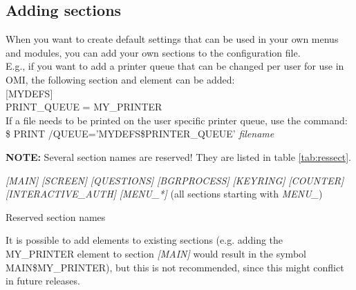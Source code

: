 \documentclass[a4paper]{book}
\newcommand{\vs}{\vspace{3mm}}
\renewcommand{\indent}{\hspace*{5mm}}
\begin{document}
\subsection{Adding sections}
\label{subsubsec:adding}

When you want to create default settings that can be used in your own menus 
and modules, you can add your own sections to the configuration file. \\
E.g., if you want to add a printer queue that can be changed per user for 
use in OMI, the following section and element can be added: \\
\indent\textsf{[MYDEFS]} \\
\indent\indent\textsf{PRINT{\_}QUEUE = MY{\_}PRINTER} \\
If a file needs to be printed on the user specific printer queue, use the command: \\
\indent\textsf{{\$} PRINT /QUEUE='MYDEFS{\$}PRINTER{\_}QUEUE' \textit{filename}}

\vs

\hspace{-8mm}\textbf{NOTE:} Several section names are reserved! They are listed in table 
\ref{tab:ressect}.

\begin{table}[h!tb]
\begin{minipage}[h!tb]{\textwidth}
\noindent\textsl{[MAIN]} \newline
\textsl{[SCREEN]} \newline
\textsl{[QUESTIONS]} \newline
\textsl{[BGRPROCESS]} \newline
\textsl{[KEYRING]} \newline
\textsl{[COUNTER]} \newline
\textsl{[INTERACTIVE{\_}AUTH]} \newline
\textsl{[MENU{\_}\textit{*}]} (all sections starting with \textsl{MENU{\_}}) \newline
\caption{Reserved section names}\label{tab:ressect}
\end{minipage}
\end{table}

\vs

It is possible to add elements to existing sections (e.g. adding the 
\linebreak MY{\_}PRINTER element to section \textsl{[MAIN]} would 
result in the symbol \linebreak MAIN{\$}MY{\_}PRINTER), but this is not recommended,
since this might conflict in future releases.
\end{document}

